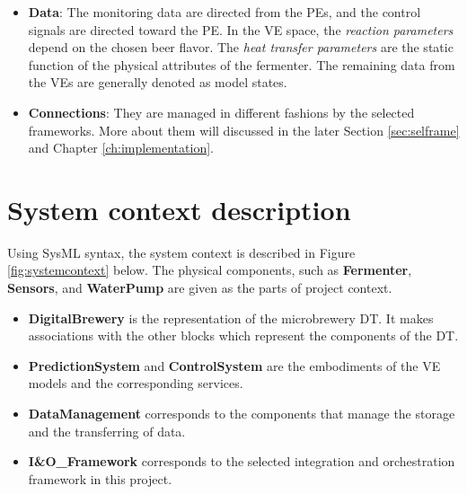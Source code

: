 \begin{itemize}
  \item \textbf{Data}: The monitoring data are directed from the PEs, and the control signals are directed toward the PE. In the VE space, the \textit{reaction parameters} depend on the chosen beer flavor. The \textit{heat transfer parameters} are the static function of the physical attributes of the fermenter. The remaining data from the VEs are generally denoted as model states. 
   
  \item \textbf{Connections}: They are managed in different fashions by the selected frameworks. More about them will discussed in the later Section \ref{sec:selframe} and Chapter \ref{ch:implementation}.

\end{itemize}

\section{System context description}
Using SysML syntax, the system context is described in Figure \ref{fig:systemcontext} below. The physical components, such as \textbf{Fermenter}, \textbf{Sensors}, and \textbf{WaterPump} are given as the parts of project context.

\begin{itemize}
\item \textbf{DigitalBrewery} is the representation of the microbrewery DT. It makes associations with the other blocks which represent the components of the DT.

\item \textbf{PredictionSystem} and \textbf{ControlSystem} are the embodiments of the VE models and the corresponding services.

\item \textbf{DataManagement} corresponds to the components that manage the storage and the transferring of data.

\item \textbf{I\&O\_Framework} corresponds to the selected integration and orchestration framework in this project. 

\end{itemize}

